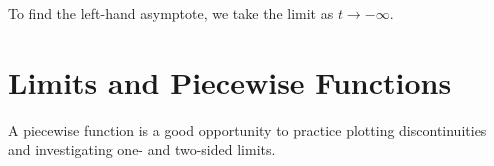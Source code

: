 \begin{maplegroup}
\begin{mapleinput}
\end{mapleinput}
\mapleresult
\begin{maplelatex}
\end{maplelatex}
\end{maplegroup}

To find the left-hand asymptote, we take the limit as $t \rightarrow -\infty$.

\begin{maplegroup}
\begin{mapleinput}
\end{mapleinput}
\mapleresult
\begin{maplelatex}
\end{maplelatex}
\end{maplegroup}

\section{Limits and Piecewise Functions}
\label{sec:limits_and_piecewise_functions}

A piecewise function is a good opportunity to practice plotting discontinuities and investigating one- and two-sided limits.
\begin{maplegroup}
\begin{mapleinput}
\end{mapleinput}
\mapleresult
\begin{maplelatex}
\end{maplelatex}
\end{maplegroup}

